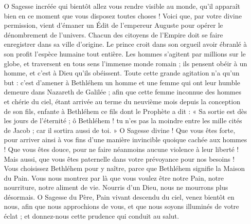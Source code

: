 \documentclass[%
fontsize=10%
,a6paper%
,DIV=15%
]{scrartcl}
\begin{document}
O Sagesse incréée qui bientôt allez vous rendre visible au monde, qu’il apparaît bien en ce moment que vous disposez toutes choses ! Voici que, par votre divine permission, vient d’émaner un Édit de l’empereur Auguste pour opérer le dénombrement de l’univers. Chacun des citoyens de l’Empire doit se faire enregistrer dans sa ville d’origine. Le prince croit dans son orgueil avoir ébranlé à son profit l’espèce humaine tout entière. Les hommes s’agitent par millions sur le globe, et traversent en tous sens l’immense monde romain ; ils pensent obéir à un homme, et c’est à Dieu qu’ils obéissent. Toute cette grande agitation n’a qu’un but : c’est d’amener à Bethléhem un homme et une femme qui ont leur humble demeure dans Nazareth de Galilée ; afin que cette femme inconnue des hommes et chérie du ciel, étant arrivée au terme du neuvième mois depuis la conception de son fils, enfante à Bethléhem ce fils dont le Prophète a dit : « Sa sortie est dès les jours de l’éternité ; ô Bethléhem ! tu n’es pas la moindre entre les mille cités de Jacob ; car il sortira aussi de toi. » O Sagesse divine ! Que vous êtes forte, pour arriver ainsi à vos fins d’une manière invincible quoique cachée aux hommes ! Que vous êtes douce, pour ne faire néanmoins aucune violence à leur liberté ! Mais aussi, que vous êtes paternelle dans votre prévoyance pour nos besoins ! Vous choisissez Bethléhem pour y naître, parce que Bethléhem signifie la Maison du Pain. Vous nous montrez par là que vous voulez être notre Pain, notre nourriture, notre aliment de vie. Nourris d’un Dieu, nous ne mourrons plus désormais. O Sagesse du Père, Pain vivant descendu du ciel, venez bientôt en nous, afin que nous approchions de vous, et que nous soyons illuminés de votre éclat ; et donnez-nous cette prudence qui conduit au salut.

\end{document}
